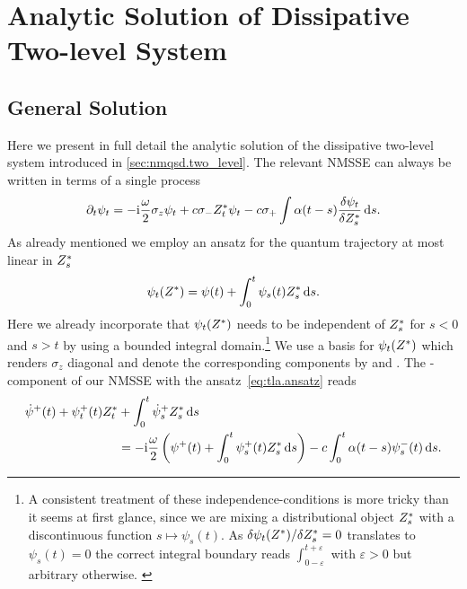 \chapter{Analytic Solution of Dissipative Two-level System}
\label{ch:tla}

\section{General Solution}
\label{sec:tla.general}
%

Here we present in full detail the analytic solution of the dissipative two-level system introduced in \autoref{sec:nmqsd.two_level}.
The relevant NMSSE can always be written in terms of a single process
\begin{equation}
  \partial_t \psi_t = -\mathrm{i}\frac{\omega}{2}\sigma_z\psi_t + c \sigma_- {Z}^*_t \psi_t - c\sigma_+ \int \alpha(t - s) \frac{\delta\psi_t}{\delta {Z}^*_s} \, \mathrm{d} s.
  \label{eq:tla.nmsse_twolevel}
\end{equation}
As already mentioned we employ an ansatz for the quantum trajectory at most linear in ${Z}^*_s$
\begin{equation}
  \psitZ = \psi(t) + \int_0^t \psi_s(t) \ZZ_s \dd s.
  \label{eq:tla.ansatz}
\end{equation}
Here we already incorporate that $\psitZ$ needs to be independent of ${Z}^*_s$ for $s < 0$ and $s>t$ by using a bounded integral domain.\footnote{A consistent treatment of these independence-conditions is more tricky than it seems at first glance, since we are mixing a distributional object ${Z}^*_s$ with a discontinuous function $s \mapsto \psi_s(t)$.
  As $\delta \psi_t({Z}^*) / \delta {Z}^*_s = 0$ translates to $\psi_s(t) = 0$ the correct integral boundary reads $\int_{0-\varepsilon}^{t+\varepsilon}$ with $\varepsilon > 0$ but arbitrary otherwise.
  \label{fn:tla.boundaries}
}
We use a basis for $\psi_t({Z}^*)$ which renders $\sigma_z$ diagonal and denote the corresponding components by \quotes{+} and \quotes{-}.
The \quotes{+}-component of our NMSSE with the ansatz~\ref{eq:tla.ansatz} reads
\begin{align}
  \dot\psi^+(t) + \psi^+_t(t){Z}^*_t &+ \int_0^t \dot\psi^+_s{Z}^*_s \, \mathrm{d} s \nonumber\\
  &= -\mathrm{i} \frac{\omega}{2} \left( \psi^+(t) + \int_0^t \psi^+_s(t){Z}^*_s \, \mathrm{d} s \right) - c \int_0^t \alpha(t-s) \psi^-_s(t) \, \mathrm{d} s.
  \label{eq:tla.psi_plus}
\end{align}
